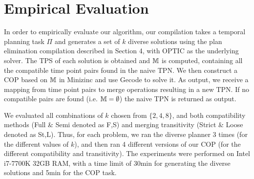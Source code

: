 
\section{Empirical Evaluation}
In order to empirically evaluate our algorithm, our compilation takes a temporal planning task $\Pi$ and generates a set of $k$ diverse solutions using the plan elimination compilation described in Section 4, with OPTIC \cite{benton2012temporal} as the underlying solver. The TPS of each solution is obtained and $\mathbb{M}$ is computed, containing all the compatible time point pairs found in the naive TPN. We then construct a COP based on $\mathbb{M}$ in Minizinc \cite{nethercote2007minizinc} and use Gecode \cite{gecode} to solve it. As output, we receive a mapping from time point pairs to merge operations resulting in a new TPN.
If no compatible pairs are found (i.e. $\mathbb{M} = \emptyset$) the naive TPN is returned as output. 


We evaluated all combinations of $k$ chosen from $\{2,4,8\}$, and both compatibility methods 
(Full \& Semi denoted as F,S) and merging transitivity (Strict \& Loose denoted as St,L). Thus, for each problem, we ran the diverse planner 3 times (for the different values of $k$), and then ran 4 different versions of our COP (for the different compatibility and transitivity). The experiments were performed on Intel i7-7700K 32GB RAM, with a time limit of 30min for generating the diverse solutions and 5min for the COP task.


